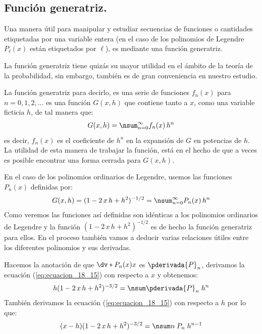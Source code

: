 \subsection{Función generatriz.}

Una manera útil para manipular y estudiar secuencias de funciones o cantidades etiquetadas por una variable entera (en el caso de los polinomios de Legendre $P_{\ell} (x)$ están etiquetados por $\ell$), es mediante una función generatriz. 
\par
La función generatriz tiene quizás su mayor utilidad en el ámbito de la teoría de la probabilidad, sin embargo, también es de gran conveniencia en nuestro estudio.
\par
La función generatriz para decirlo, es una serie de funciones $f_{n} (x)$ para $n = 0, 1, 2,\ldots$ es una función $G (x, h)$ que contiene tanto a $x$, como una variable ficticia $h$, de tal manera que:
\begin{align*}
G (x,h) = \nsum_{n=0}^{\infty} f_{n} (x) \, h^{n}
\end{align*}
es decir, $f_{n} (x)$ es el coeficiente de $h^{n}$ en la expansión de $G$ en potencias de $h$. La utilidad de esta manera de trabajar la función, está en el hecho de que a veces es posible encontrar una forma cerrada para $G (x, h)$.
\par
En el caso de los polinomios ordinarios de Legendre, usemos las funciones $P_{n} (x)$ definidas por:
\begin{align}
G (x ,h) = (1 - 2 \, x \, h + h^{2})^{-1/2} =  \nsum_{n=0}^{\infty} P_{n} (x) \, h^{n}
\label{eq:ecuacion_18_15}
\end{align}
Como veremos las funciones así definidas son idénticas a los polinomios ordinarios de Legendre y la función $(1 - 2 \, x \, h + h^{2})^{-1/2}$ es de hecho la función generatriz para ellos. En el proceso también vamos a deducir varias relaciones útiles entre los diferentes polinomios y sus derivadas.
\par
Hacemos la anotación de que $\dv*{P_{n}(x)}{x}$ es $\pderivada{P}_{n}$, derivamos la ecuación (\ref{eq:ecuacion_18_15}) con respecto a $x$ y obtenemos:
\begin{align}
h (1 - 2 \, x \, h + h^{2})^{-3/2} = \nsum \pderivada{P}_{n} \; h^{n}
\label{eq:ecuacion_18_16}
\end{align}
También derivamos la ecuación (\ref{eq:ecuacion_18_15}) con respecto a $h$ por lo que:
\begin{align}
(x - h) (1 - 2 \, x \, h + h^{2})^{-3/2} = \nsum n \; P_{n} \; h^{n-1}
\label{eq:ecuacion_18_17}
\end{align}
